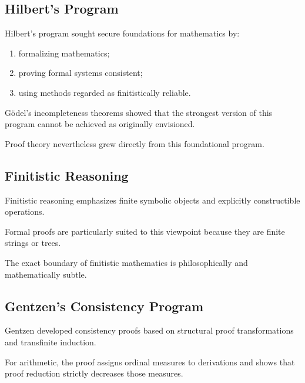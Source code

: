 \subsection{Hilbert's Program}
\label{subsec:hilberts-program}

Hilbert's program sought secure foundations for mathematics by:

\begin{enumerate}
    \item formalizing mathematics;
    \item proving formal systems consistent;
    \item using methods regarded as finitistically reliable.
\end{enumerate}

Gödel's incompleteness theorems showed that the strongest version of this
program cannot be achieved as originally envisioned.

Proof theory nevertheless grew directly from this foundational program.

\subsection{Finitistic Reasoning}
\label{subsec:finitistic-reasoning}

Finitistic reasoning emphasizes finite symbolic objects and explicitly
constructible operations.

Formal proofs are particularly suited to this viewpoint because they are
finite strings or trees.

The exact boundary of finitistic mathematics is philosophically and
mathematically subtle.

\subsection{Gentzen's Consistency Program}
\label{subsec:gentzen-consistency-program}

Gentzen developed consistency proofs based on structural proof
transformations and transfinite induction.

For arithmetic, the proof assigns ordinal measures to derivations and shows
that proof reduction strictly decreases those measures.

